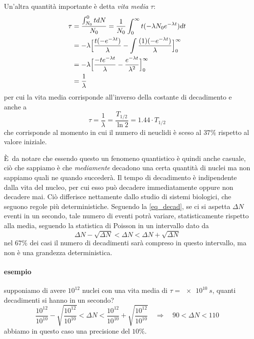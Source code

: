 Un'altra quantità importante è detta \emph{vita media} $\tau$: 
\begin{equation}
\begin{split}
\tau & = \frac{\int_{N_0}^{0} t dN}{N_0}  = \frac{1}{N_0} \int_0^{\infty} t (-\lambda N_0 e^{ -\lambda t })dt \\
& = - \lambda \Bigl[  \frac{t (-e^{-\lambda t})}{\lambda} - \int \frac{(1) (-e^{ -\lambda t })}{\lambda} \Bigr]_0^{\infty} \\
& = - \lambda \Bigl[  \frac{- t e^{-\lambda t}}{\lambda} - \frac{ e^{ -\lambda t }}{\lambda^2} \Bigr]_0^{\infty} \\
& = \frac{1}{\lambda}
\end{split}
\end{equation}
per cui la vita media corrisponde all'inverso della costante di decadimento e anche a
\begin{equation}
\tau = \frac{1}{\lambda} = \frac{T_{1/2}}{\ln 2} = 1.44 \cdot T_{1/2}
\end{equation}
che corrisponde al momento in cui il numero di neuclidi è sceso al $37\%$ rispetto al valore iniziale.

È da notare che essendo questo un fenomeno quantistico è quindi anche casuale, ciò che sappiamo è che \emph{mediamente} decadono una certa quantità di nuclei ma non sappiamo quali ne quando succederà.
Il tempo di decadimento è indipendente dalla vita del nucleo, per cui esso può decadere immediatamente oppure non decadere mai. 
Ciò differisce nettamente dallo studio di sistemi biologici, che seguono regole più deterministiche.
Seguendo la \ref{eq_decad}, se ci si aspetta $\Delta N $ eventi in un secondo, tale numero di eventi potrà variare, statisticamente rispetto alla media, seguendo la statistica di Poisson in un intervallo dato da
\begin{equation}
\Delta N - \sqrt{\Delta N} < \Delta N < \Delta N + \sqrt{\Delta N}
\end{equation}
nel $67\%$ dei casi il numero di decadimenti sarà compreso in questo intervallo, ma non è una grandezza deterministica.

\paragraph{esempio} supponiamo di avere $10^{12}$ nuclei con una vita media di $\tau = \SI{e10}{s}$, 
quanti decadimenti si hanno in un secondo?
\begin{equation}
\frac{10^{12}}{10^{10}} - \sqrt{\frac{10^{12}}{10^{10}} } < \Delta N < \frac{10^{12}}{10^{10}} + \sqrt{\frac{10^{12}}{10^{10}} } \quad\Rightarrow\quad 90 < \Delta N < 110
\end{equation}
abbiamo in questo caso una precisione del $10\%$.

